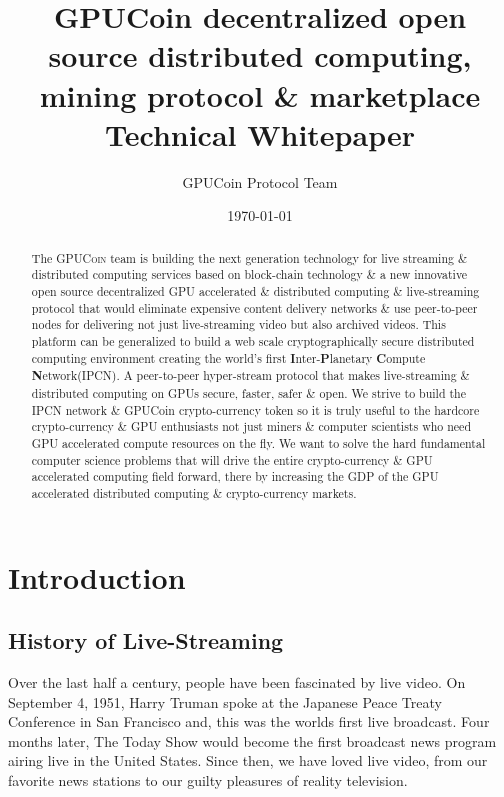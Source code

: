 \documentclass{article}
\title{GPUCoin decentralized 
open source 
 distributed computing, mining protocol \& marketplace Technical Whitepaper}
\author{GPUCoin Protocol Team}
\date{\today}
\begin{document}
\maketitle

\begin{abstract}
The \textsc{GPUCoin} team is building the next generation technology for live streaming \& distributed computing services based on block-chain technology \& a new innovative open source decentralized GPU accelerated \& distributed computing \& live-streaming protocol that would eliminate expensive content delivery networks \& use peer-to-peer nodes for delivering not just live-streaming video but also archived videos. This platform can be generalized to build a web scale cryptographically secure distributed computing environment creating the world's first \textbf{I}nter-\textbf{P}lanetary \textbf{C}ompute \textbf{N}etwork(\textsc{IPCN}). A peer-to-peer hyper-stream protocol that makes live-streaming \& distributed computing on GPUs secure, faster, safer \& open. We strive to build the IPCN network \& GPUCoin crypto-currency token so it is truly useful to the hardcore crypto-currency \& GPU enthusiasts not just miners \& computer scientists who need GPU accelerated compute resources on the fly. We want to solve the hard fundamental computer science problems that will drive the entire crypto-currency \& GPU accelerated computing field forward, there by increasing the GDP of the GPU accelerated distributed computing \& crypto-currency markets.

\end{abstract}
\newpage

\tableofcontents
\newpage

\section{Introduction}
\subsection{History of Live-Streaming}
Over the last half a century, people have been fascinated by live video. On September 4, 1951, Harry Truman spoke at the Japanese Peace Treaty Conference in San Francisco and, this was the worlds first live broadcast. Four months later, The Today Show would become the first broadcast news program airing live in the United States. Since then, we have loved live video, from our favorite news stations to our guilty pleasures of reality television.
\end{document}
